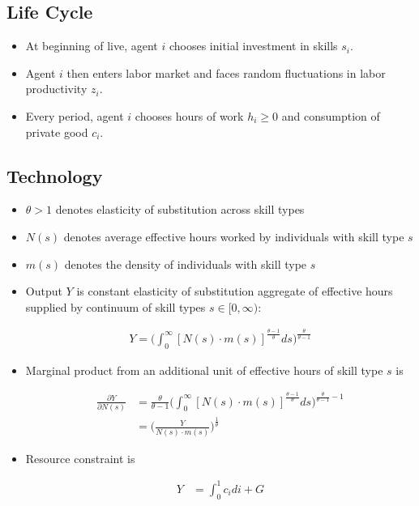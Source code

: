 \documentclass{article}
\begin{document}
\subsection{Life Cycle}

\begin{itemize}

\item At beginning of live, agent $i$ chooses initial investment in skills $s_i$.

\item Agent $i$ then enters labor market and faces random  fluctuations in labor productivity $z_i$.

\item Every period, agent $i$ chooses hours of work $h_i \ge 0$ and consumption of private good $c_i$.

\end{itemize}

\subsection{Technology}

\begin{itemize}

\item $\theta > 1$ denotes elasticity of substitution across skill types

\item $N(s)$ denotes average effective hours worked by individuals with skill type $s$

\item $m(s)$ denotes the density of individuals with skill type $s$

\item Output $Y$ is constant elasticity of substitution aggregate of effective hours supplied by continuum of skill types $s \in [0,\infty)$:

\begin{align}
Y = \Bigg( \int_0^\infty [N(s) \cdot m(s)]^{\frac{\theta - 1}{\theta}} ds \Bigg)^{\frac{\theta}{\theta - 1}} \label{fg_production}
\end{align}

\item Marginal product from an additional unit of effective hours of skill type $s$ is

\begin{align*}
\frac{\partial Y}{\partial N(s)} &= \frac{\theta}{\theta - 1}\Bigg( \int_0^\infty [N(s) \cdot m(s)]^{\frac{\theta - 1}{\theta}} ds \Bigg)^{\frac{\theta}{\theta - 1} - 1}\\
&= \Bigg( \frac{Y}{N(s)\cdot m(s)} \Bigg)^{\frac{1}{\theta}}
\end{align*}

\item Resource constraint is

\begin{align}
Y &= \int_0^1 c_i di + G \label{rc}
\end{align}

\end{itemize}
\end{document}
